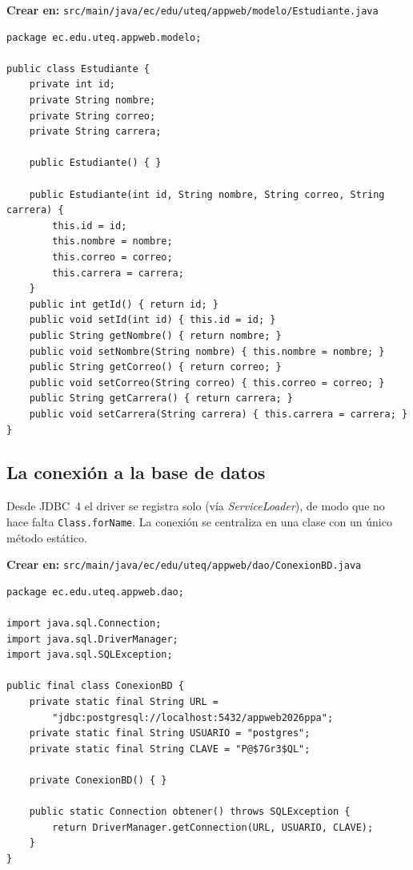 {\small\textbf{Crear en:} \texttt{src/main/java/ec/edu/uteq/appweb/modelo/Estudiante.java}}
\begin{lstlisting}[style=java,caption={Estudiante.java (JavaBean del dominio)},label={lst:jsp-modelo}]
package ec.edu.uteq.appweb.modelo;

public class Estudiante {
    private int id;
    private String nombre;
    private String correo;
    private String carrera;

    public Estudiante() { }

    public Estudiante(int id, String nombre, String correo, String carrera) {
        this.id = id;
        this.nombre = nombre;
        this.correo = correo;
        this.carrera = carrera;
    }
    public int getId() { return id; }
    public void setId(int id) { this.id = id; }
    public String getNombre() { return nombre; }
    public void setNombre(String nombre) { this.nombre = nombre; }
    public String getCorreo() { return correo; }
    public void setCorreo(String correo) { this.correo = correo; }
    public String getCarrera() { return carrera; }
    public void setCarrera(String carrera) { this.carrera = carrera; }
}
\end{lstlisting}

\subsection{La conexión a la base de datos}
\label{ap:crud:jsp:conexion}

Desde JDBC~4 el driver se registra solo (vía \emph{ServiceLoader}), de
modo que no hace falta \texttt{Class.forName}. La conexión se centraliza
en una clase con un único método estático.

{\small\textbf{Crear en:} \texttt{src/main/java/ec/edu/uteq/appweb/dao/ConexionBD.java}}
\begin{lstlisting}[style=java,caption={ConexionBD.java (conexion JDBC centralizada)},label={lst:jsp-conexion}]
package ec.edu.uteq.appweb.dao;

import java.sql.Connection;
import java.sql.DriverManager;
import java.sql.SQLException;

public final class ConexionBD {
    private static final String URL =
        "jdbc:postgresql://localhost:5432/appweb2026ppa";
    private static final String USUARIO = "postgres";
    private static final String CLAVE = "P@$7Gr3$QL";

    private ConexionBD() { }

    public static Connection obtener() throws SQLException {
        return DriverManager.getConnection(URL, USUARIO, CLAVE);
    }
}
\end{lstlisting}


